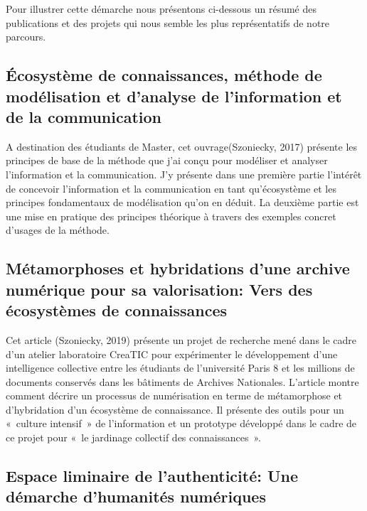 \documentclass[
  a4paper,
  DIV=11,
  numbers=noendperiod]{scrreprt}
\begin{document}
Pour illustrer cette démarche nous présentons ci-dessous un résumé des
publications et des projets qui nous semble les plus représentatifs de
notre parcours.

\subsection{Écosystème de connaissances, méthode de modélisation et
d'analyse de l'information et de la
communication}\label{uxe9cosystuxe8me-de-connaissances-muxe9thode-de-moduxe9lisation-et-danalyse-de-linformation-et-de-la-communication}

A destination des étudiants de Master, cet ouvrage(Szoniecky, 2017)
présente les principes de base de la méthode que j'ai conçu pour
modéliser et analyser l'information et la communication. J'y présente
dans une première partie l'intérêt de concevoir l'information et la
communication en tant qu'écosystème et les principes fondamentaux de
modélisation qu'on en déduit. La deuxième partie est une mise en
pratique des principes théorique à travers des exemples concret d'usages
de la méthode.

\subsection{Métamorphoses et hybridations d'une archive numérique pour
sa valorisation: Vers des écosystèmes de
connaissances}\label{muxe9tamorphoses-et-hybridations-dune-archive-numuxe9rique-pour-sa-valorisation-vers-des-uxe9cosystuxe8mes-de-connaissances}

Cet article (Szoniecky, 2019) présente un projet de recherche mené dans
le cadre d'un atelier laboratoire CreaTIC pour expérimenter le
développement d'une intelligence collective entre les étudiants de
l'université Paris 8 et les millions de documents conservés dans les
bâtiments de Archives Nationales. L'article montre comment décrire un
processus de numérisation en terme de métamorphose et d'hybridation d'un
écosystème de connaissance. Il présente des outils pour un «~culture
intensif~» de l'information et un prototype développé dans le cadre de
ce projet pour «~le jardinage collectif des connaissances~».

\subsection{Espace liminaire de l'authenticité: Une démarche d'humanités
numériques}\label{espace-liminaire-de-lauthenticituxe9-une-duxe9marche-dhumanituxe9s-numuxe9riques}
\end{document}
